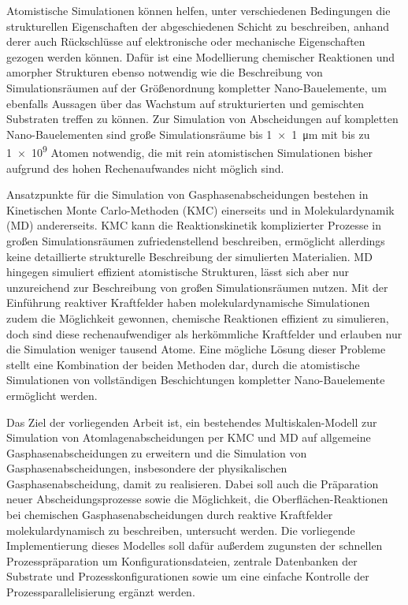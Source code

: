 Atomistische Simulationen können helfen, unter verschiedenen Bedingungen die strukturellen Eigenschaften der abgeschiedenen Schicht zu beschreiben, anhand derer auch Rückschlüsse auf elektronische\cite{aspnes_optical_1982,steudel_influence_2004} oder mechanische Eigenschaften\cite{chasiotis_mechanical_2003,cammarata_nanoindentation_1990} gezogen werden können.
Dafür ist eine Modellierung chemischer Reaktionen und amorpher Strukturen ebenso notwendig wie die Beschreibung von Simulationsräumen auf der Größenordnung kompletter Nano-Bauelemente, um ebenfalls Aussagen über das Wachstum auf strukturierten und gemischten Substraten treffen zu können.
Zur Simulation von Abscheidungen auf kompletten Nano-Bauelementen sind große Simulationsräume bis \SI{1x1}{\micro\meter} mit bis zu \num{1e9} Atomen notwendig, die mit rein atomistischen Simulationen bisher aufgrund des hohen Rechenaufwandes nicht möglich sind\cite{plimpton_computational_1995}.

Ansatzpunkte für die Simulation von Gasphasenabscheidungen bestehen in Kinetischen Monte Carlo-Methoden (KMC)\cite{voter_introduction_2007} einerseits und in Molekulardynamik (MD)\cite{hoover_molecular_1986} andererseits.
KMC kann die Reaktionskinetik komplizierter Prozesse in großen Simulationsräumen zufriedenstellend beschreiben, ermöglicht allerdings keine detaillierte strukturelle Beschreibung der simulierten Materialien.
MD hingegen simuliert effizient atomistische Strukturen, lässt sich aber nur unzureichend zur Beschreibung von großen Simulationsräumen nutzen.
Mit der Einführung reaktiver Kraftfelder haben molekulardynamische Simulationen zudem die Möglichkeit gewonnen, chemische Reaktionen effizient zu simulieren, doch sind diese rechenaufwendiger als herkömmliche Kraftfelder und erlauben nur die Simulation weniger tausend Atome\cite{van_duin_reaxff:_2001}.
Eine mögliche Lösung dieser Probleme stellt eine Kombination der beiden Methoden dar, durch die atomistische Simulationen von vollständigen Beschichtungen kompletter Nano-Bauelemente ermöglicht werden.


Das Ziel der vorliegenden Arbeit ist, ein bestehendes Multiskalen-Modell zur Simulation von Atomlagenabscheidungen per KMC und MD auf allgemeine Gasphasenabscheidungen zu erweitern und die Simulation von Gasphasenabscheidungen, insbesondere der physikalischen Gasphasenabscheidung, damit zu realisieren.
Dabei soll auch die Präparation neuer Abscheidungsprozesse sowie die Möglichkeit, die Oberflächen-Reaktionen bei chemischen Gasphasenabscheidungen durch reaktive Kraftfelder molekulardynamisch zu beschreiben, untersucht werden.
Die vorliegende Implementierung dieses Modelles soll dafür außerdem zugunsten der schnellen Prozesspräparation um Konfigurationsdateien, zentrale Datenbanken der Substrate und Prozesskonfigurationen sowie um eine einfache Kontrolle der Prozessparallelisierung ergänzt werden.

